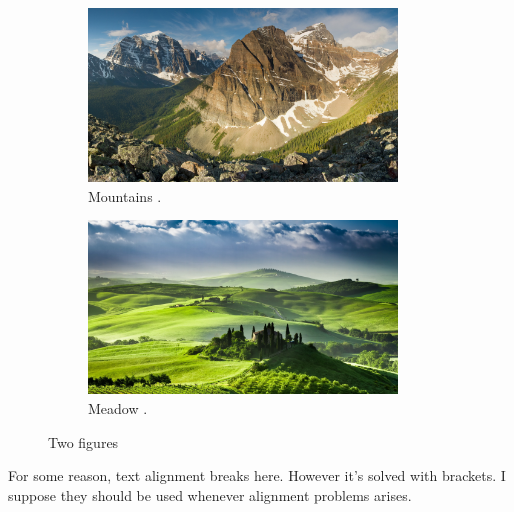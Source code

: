 \documentclass[a4paper]{report}
\begin{document}
\begin{figure}[h]
	
	\begin{subfigure}{.5\textwidth}
		\centering
		\includegraphics[width = 0.9\textwidth]{Mountains}
		\caption{Mountains \cite{Nature}.}
	\end{subfigure}%
	\begin{subfigure}{.5\textwidth}
		\centering
		\includegraphics[width = 0.9\textwidth]{Meadow}
		\caption{Meadow \cite{Nature}.}
	\end{subfigure}
	\caption{Two figures}
	
\end{figure}

{For some reason, text alignment breaks here. However it's solved with brackets. I suppose they should be used whenever alignment problems arises.}


\listoffigures


\newpage









\end{document}
